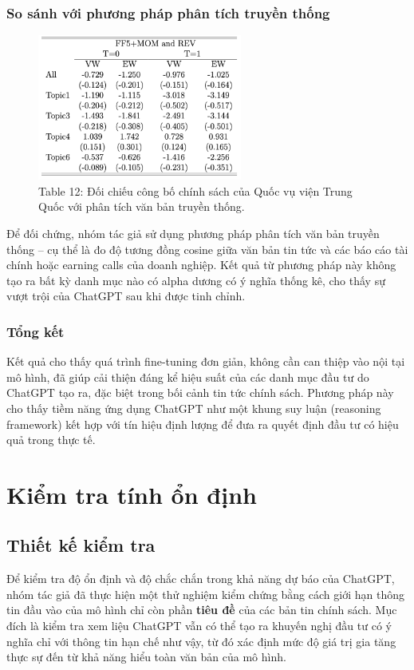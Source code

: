 \documentclass[a4paper,12pt]{article}
\begin{document}
\subsubsection{So sánh với phương pháp phân tích truyền thống}
\begin{figure}[H]
    \centering
    \includegraphics[width=0.6\textwidth]{table/tab12.png}
    \caption*{Table 12: Đối chiếu công bố chính sách của Quốc vụ viện Trung Quốc với phân tích văn bản truyền thống.}
    \label{fig:fig2}
\end{figure}
Để đối chứng, nhóm tác giả sử dụng phương pháp phân tích văn bản truyền thống – cụ thể là đo độ tương đồng cosine giữa văn bản tin tức và các báo cáo tài chính hoặc earning calls của doanh nghiệp. Kết quả từ phương pháp này không tạo ra bất kỳ danh mục nào có alpha dương có ý nghĩa thống kê, cho thấy sự vượt trội của ChatGPT sau khi được tinh chỉnh.

\subsubsection{Tổng kết}
Kết quả cho thấy quá trình fine-tuning đơn giản, không cần can thiệp vào nội tại mô hình, đã giúp cải thiện đáng kể hiệu suất của các danh mục đầu tư do ChatGPT tạo ra, đặc biệt trong bối cảnh tin tức chính sách. Phương pháp này cho thấy tiềm năng ứng dụng ChatGPT như một khung suy luận (reasoning framework) kết hợp với tín hiệu định lượng để đưa ra quyết định đầu tư có hiệu quả trong thực tế.

\section{Kiểm tra tính ổn định}

\subsection{Thiết kế kiểm tra}

Để kiểm tra độ ổn định và độ chắc chắn trong khả năng dự báo của ChatGPT, nhóm tác giả đã thực hiện một thử nghiệm kiểm chứng bằng cách giới hạn thông tin đầu vào của mô hình chỉ còn phần \textbf{tiêu đề} của các bản tin chính sách. Mục đích là kiểm tra xem liệu ChatGPT vẫn có thể tạo ra khuyến nghị đầu tư có ý nghĩa chỉ với thông tin hạn chế như vậy, từ đó xác định mức độ giá trị gia tăng thực sự đến từ khả năng hiểu toàn văn bản của mô hình.
\end{document}
